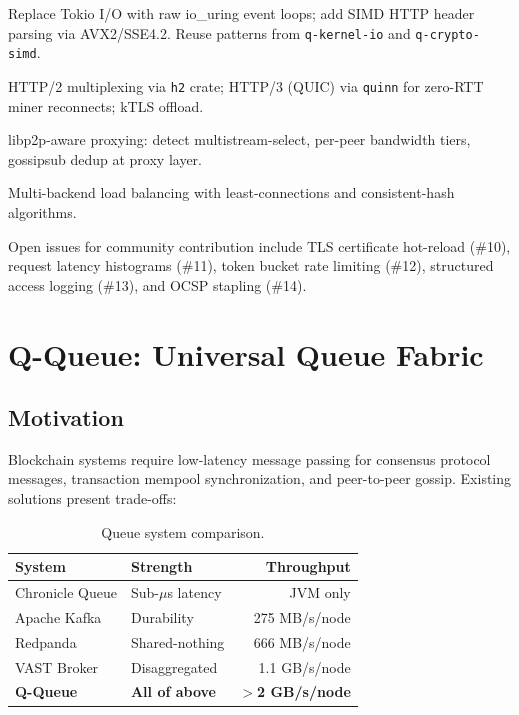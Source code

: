 \documentclass[11pt,a4paper,twocolumn]{article}
\begin{document}
\begin{description}[nosep]
\item[Phase 2:] Replace Tokio I/O with raw io\_uring event loops; add SIMD HTTP header parsing via AVX2/SSE4.2. Reuse patterns from \texttt{q-kernel-io} and \texttt{q-crypto-simd}.
\item[Phase 3:] HTTP/2 multiplexing via \texttt{h2} crate; HTTP/3 (QUIC) via \texttt{quinn} for zero-RTT miner reconnects; kTLS offload.
\item[Phase 4:] libp2p-aware proxying: detect multistream-select, per-peer bandwidth tiers, gossipsub dedup at proxy layer.
\item[Phase 5:] Multi-backend load balancing with least-connections and consistent-hash algorithms.
\end{description}

Open issues for community contribution include TLS certificate hot-reload (\#10), request latency histograms (\#11), token bucket rate limiting (\#12), structured access logging (\#13), and OCSP stapling (\#14).

\section{Q-Queue: Universal Queue Fabric}

\subsection{Motivation}

Blockchain systems require low-latency message passing for consensus protocol messages, transaction mempool synchronization, and peer-to-peer gossip. Existing solutions present trade-offs:

\begin{table}[H]
\centering
\footnotesize
\begin{tabular}{llr}
\toprule
\textbf{System} & \textbf{Strength} & \textbf{Throughput} \\
\midrule
Chronicle Queue & Sub-$\mu$s latency & JVM only \\
Apache Kafka & Durability & 275 MB/s/node \\
Redpanda & Shared-nothing & 666 MB/s/node \\
VAST Broker & Disaggregated & 1.1 GB/s/node \\
\textbf{Q-Queue} & \textbf{All of above} & \textbf{$>$2 GB/s/node} \\
\bottomrule
\end{tabular}
\caption{Queue system comparison.}
\end{table}
\end{document}
